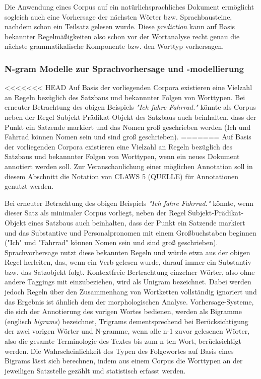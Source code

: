 \documentclass[12pt]{article}
\begin{document}
Die Anwendung eines Corpus auf ein natürlichsprachliches Dokument ermöglicht sogleich auch eine Vorhersage der nächsten Wörter bzw. Sprachbausteine, nachdem schon ein Teilsatz gelesen wurde. Diese \textit{prediction} kann auf Basis bekannter Regelmäßigkeiten also schon vor der Wortanalyse recht genau die nächste grammatikalische Komponente bzw. den Worttyp vorhersagen.

\subsubsection{N-gram Modelle zur Sprachvorhersage und -modellierung}
<<<<<<< HEAD
Auf Basis der vorliegenden Corpora existieren eine Vielzahl an Regeln bezüglich des Satzbaus und bekannnter Folgen von Worttypen. Bei erneuter Betrachtung des obigen Beispiels \textit{"Ich fahre Fahrrad."} könnte als Corpus neben der Regel Subjekt-Prädikat-Objekt des Satzbaus auch beinhalten, dass der Punkt ein Satzende markiert und das Nomen groß geschrieben werden (Ich und Fahrrad können Nomen sein und sind groß geschrieben).
=======
Auf Basis der vorliegenden Corpora existieren eine Vielzahl an Regeln bezüglich des Satzbaus und bekannnter Folgen von Worttypen, wenn ein neues Dokument annotiert werden soll. Zur Veranschaulichung einer möglichen Annotation soll in diesem Abschnitt die Notation von CLAWS 5 (QUELLE) für Annotationen genutzt werden.

Bei erneuter Betrachtung des obigen Beispiels \textit{"Ich fahre Fahrrad."} könnte, wenn dieser Satz als minimaler Corpus vorliegt, neben der Regel Subjekt-Prädikat-Objekt eines Satzbaus auch beinhalten, dass der Punkt ein Satzende markiert und das Substantive und Personalpronomen mit einem Großbuchstaben beginnen ("Ich" und "Fahrrad" können Nomen sein und sind groß geschrieben). Sprachvorhersage nutzt diese bekannten Regeln und würde etwa aus der obigen Regel herleiten, das, wenn ein Verb gelesen wurde, darauf immer ein Substantiv bzw. das Satzobjekt folgt. Kontextfreie Bertrachtung einzelner Wörter, also ohne andere Taggings mit einzubeziehen, wird als Unigram bezeichnet. Dabei werden jedoch Regeln über den Zusammenhang von Wortketten vollständig ignoriert und das Ergebnis ist ähnlich dem der morphologischen Analyse. Vorhersage-Systeme, die sich der Annotierung des vorigen Wortes bedienen, werden als Bigramme (englisch \textit{bigrams}) bezeichnet, Trigrams dementsprechend bei Berücksichtigung der zwei vorigen Wörter und N-gramme, wenn alle n-1 zuvor gelesenen Wörter, also die gesamte Terminologie des Textes bis zum n-ten Wort, berücksichtigt werden.
Die Wahrscheinlichkeit des Typen des Folgewortes auf Basis eines Bigrams lässt sich berechnen, indem aus einem Corpus die Worttypen an der jeweiligen Satzstelle gezählt und statistisch erfasst werden. 
\end{document}
